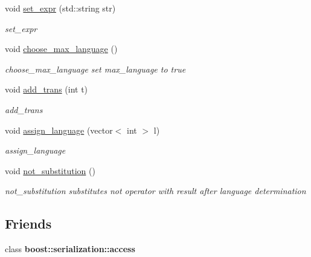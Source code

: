 \begin{DoxyCompactItemize}
void \hyperlink{class_pattern_a54cdffa32c1864cf10d352284116767e}{set\+\_\+expr} (std\+::string str)
\begin{DoxyCompactList}\small\item\em set\+\_\+expr \end{DoxyCompactList}\item 
void \hyperlink{class_pattern_a57f4cee0c0c88ef7ca4d2b8711d60f41}{choose\+\_\+max\+\_\+language} ()\hypertarget{class_pattern_a57f4cee0c0c88ef7ca4d2b8711d60f41}{}\label{class_pattern_a57f4cee0c0c88ef7ca4d2b8711d60f41}

\begin{DoxyCompactList}\small\item\em choose\+\_\+max\+\_\+language set max\+\_\+language to true \end{DoxyCompactList}\item 
void \hyperlink{class_pattern_a90cf4b5ea94e949c1a206ff662dfe8c2}{add\+\_\+trans} (int t)
\begin{DoxyCompactList}\small\item\em add\+\_\+trans \end{DoxyCompactList}\item 
void \hyperlink{class_pattern_ac0629ef0c4dcd91b3976f945ece47aef}{assign\+\_\+language} (vector$<$ int $>$ l)
\begin{DoxyCompactList}\small\item\em assign\+\_\+language \end{DoxyCompactList}\item 
void \hyperlink{class_pattern_afbdbce628c0b1ff61f02b9b015998e06}{not\+\_\+substitution} ()\hypertarget{class_pattern_afbdbce628c0b1ff61f02b9b015998e06}{}\label{class_pattern_afbdbce628c0b1ff61f02b9b015998e06}

\begin{DoxyCompactList}\small\item\em not\+\_\+substitution substitutes not operator with result after language determination \end{DoxyCompactList}\end{DoxyCompactItemize}
\subsection*{Friends}
\begin{DoxyCompactItemize}
\item 
class {\bfseries boost\+::serialization\+::access}\hypertarget{class_pattern_ac98d07dd8f7b70e16ccb9a01abf56b9c}{}\label{class_pattern_ac98d07dd8f7b70e16ccb9a01abf56b9c}

\end{DoxyCompactItemize}


